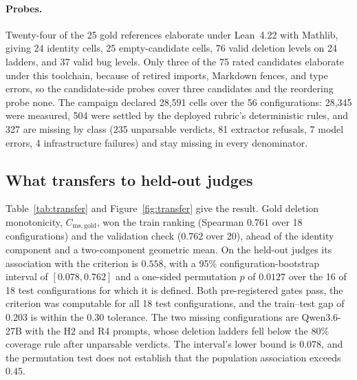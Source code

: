 \paragraph{Probes.}
Twenty-four of the 25 gold references elaborate under Lean~4.22 with Mathlib, giving 24 identity cells, 25 empty-candidate cells, 76 valid deletion levels on 24 ladders, and 37 valid bug levels.
Only three of the 75 rated candidates elaborate under this toolchain, because of retired imports, Markdown fences, and type errors, so the candidate-side probes cover three candidates and the reordering probe none.
The campaign declared 28{,}591 cells over the 56 configurations: 28{,}345 were measured, 504 were settled by the deployed rubric's deterministic rules, and 327 are missing by class (235 unparsable verdicts, 81 extractor refusals, 7 model errors, 4 infrastructure failures) and stay missing in every denominator.

\subsection{What transfers to held-out judges}\label{sec:transfer}
Table~\ref{tab:transfer} and Figure~\ref{fig:transfer} give the result.
Gold deletion monotonicity, $C_{\mathrm{ms,gold}}$, won the train ranking (Spearman $0.761$ over 18 configurations) and the validation check ($0.762$ over 20), ahead of the identity component and a two-component geometric mean.
On the held-out judges its association with the criterion is $0.558$, with a 95\% configuration-bootstrap interval of $[0.078, 0.762]$ and a one-sided permutation $p$ of $0.0127$ over the 16 of 18 test configurations for which it is defined.
Both pre-registered gates pass, the criterion was computable for all 18 test configurations, and the train--test gap of $0.203$ is within the $0.30$ tolerance.
The two missing configurations are Qwen3.6-27B with the H2 and R4 prompts, whose deletion ladders fell below the 80\% coverage rule after unparsable verdicts.
The interval's lower bound is $0.078$, and the permutation test does not establish that the population association exceeds $0.45$.

